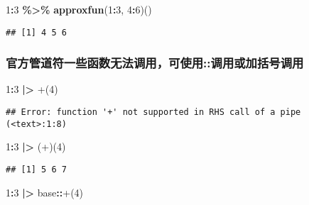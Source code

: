 \documentclass[
]{article}
\newenvironment{Shaded}{\begin{snugshade}}{\end{snugshade}}
\newcommand{\AttributeTok}[1]{\textcolor[rgb]{0.13,0.29,0.53}{#1}}
\newcommand{\DecValTok}[1]{\textcolor[rgb]{0.00,0.00,0.81}{#1}}
\newcommand{\FunctionTok}[1]{\textcolor[rgb]{0.13,0.29,0.53}{\textbf{#1}}}
\newcommand{\NormalTok}[1]{#1}
\newcommand{\SpecialCharTok}[1]{\textcolor[rgb]{0.81,0.36,0.00}{\textbf{#1}}}
\newcommand{\StringTok}[1]{\textcolor[rgb]{0.31,0.60,0.02}{#1}}
\begin{document}
\begin{Shaded}
\begin{Highlighting}[]
\DecValTok{1}\SpecialCharTok{:}\DecValTok{3} \SpecialCharTok{\%\textgreater{}\%} \FunctionTok{approxfun}\NormalTok{(}\DecValTok{1}\SpecialCharTok{:}\DecValTok{3}\NormalTok{, }\DecValTok{4}\SpecialCharTok{:}\DecValTok{6}\NormalTok{)()}
\end{Highlighting}
\end{Shaded}

\begin{verbatim}
## [1] 4 5 6
\end{verbatim}

\subsubsection{官方管道符一些函数无法调用，可使用::调用或加括号调用}\label{ux5b98ux65b9ux7ba1ux9053ux7b26ux4e00ux4e9bux51fdux6570ux65e0ux6cd5ux8c03ux7528ux53efux4f7fux7528ux8c03ux7528ux6216ux52a0ux62ecux53f7ux8c03ux7528}

\begin{Shaded}
\begin{Highlighting}[]
\DecValTok{1}\SpecialCharTok{:}\DecValTok{3} \SpecialCharTok{|\textgreater{}} \StringTok{\textasciigrave{}}\AttributeTok{+}\StringTok{\textasciigrave{}}\NormalTok{(}\DecValTok{4}\NormalTok{)}
\end{Highlighting}
\end{Shaded}

\begin{verbatim}
## Error: function '+' not supported in RHS call of a pipe (<text>:1:8)
\end{verbatim}

\begin{Shaded}
\begin{Highlighting}[]
\DecValTok{1}\SpecialCharTok{:}\DecValTok{3} \SpecialCharTok{|\textgreater{}}\NormalTok{ (}\StringTok{\textasciigrave{}}\AttributeTok{+}\StringTok{\textasciigrave{}}\NormalTok{)(}\DecValTok{4}\NormalTok{)}
\end{Highlighting}
\end{Shaded}

\begin{verbatim}
## [1] 5 6 7
\end{verbatim}

\begin{Shaded}
\begin{Highlighting}[]
\DecValTok{1}\SpecialCharTok{:}\DecValTok{3} \SpecialCharTok{|\textgreater{}}\NormalTok{ base}\SpecialCharTok{::}\StringTok{\textasciigrave{}}\AttributeTok{+}\StringTok{\textasciigrave{}}\NormalTok{(}\DecValTok{4}\NormalTok{)}
\end{Highlighting}
\end{Shaded}
\end{document}
